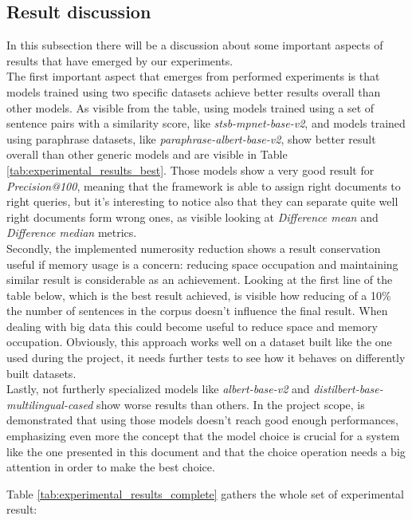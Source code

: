 \documentclass[\main/main.tex]{subfiles}
\begin{document}
\subsection{Result discussion}
In this subsection there will be a discussion about some important aspects of results that have emerged by our experiments. \\
The first important aspect that emerges from performed experiments is that models trained using two specific datasets achieve better results overall than other models. As visible from the table, using models trained using a set of sentence pairs with a similarity score, like \emph{stsb-mpnet-base-v2}, and models trained using paraphrase datasets, like \emph{paraphrase-albert-base-v2}, show better result overall than other generic models and are visible in Table \ref{tab:experimental_results_best}. Those models show a very good result for \emph{Precision@100}, meaning that the framework is able to assign right documents to right queries, but it's interesting to notice also that they can separate quite well right documents form wrong ones, as visible looking at \emph{Difference mean} and \emph{Difference median} metrics.\\
Secondly, the implemented numerosity reduction shows a result conservation useful if memory usage is a concern: reducing space occupation and maintaining similar result is considerable as an achievement. Looking at the first line of the table below, which is the best result achieved, is visible how reducing of a 10\% the number of sentences in the corpus doesn't influence the final result. When dealing with big data this could become useful to reduce space and memory occupation. Obviously, this approach works well on a dataset built like the one used during the project, it needs further tests to see how it behaves on differently built datasets.\\
Lastly, not furtherly specialized models like \emph{albert-base-v2} and \emph{distilbert-base-multilingual-cased} show worse results than others. In the project scope, is demonstrated that using those models doesn't reach good enough performances, emphasizing even more the concept that the model choice is crucial for a system like the one presented in this document and that the choice operation needs a big attention in order to make the best choice.

Table \ref{tab:experimental_results_complete} gathers the whole set of experimental result:\\
\end{document}
